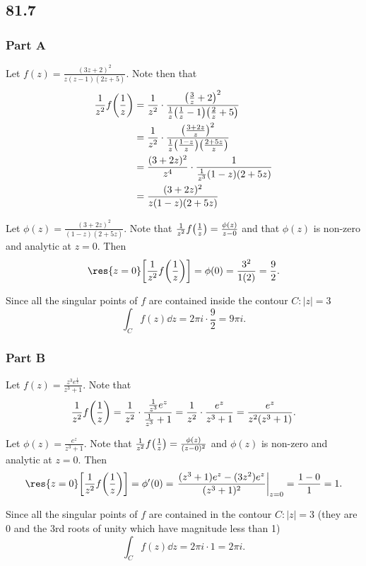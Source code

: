 \documentclass[12pt]{extarticle}
\begin{document}
\subsection*{81.7}
\begin{problem} \subsubsection*{Part A}
    Let $f(z) = \frac{(3z+2)^2}{z(z-1)(2 z+5)}$. Note then that
    \begin{align*}
        \frac{1}{z^2} f\qty(\frac{1}{z}) &= \frac{1}{z^2} \cdot \frac{\qty(\frac{3}{z} + 2)^2}{\frac{1}{z}\qty(\frac{1}{z} - 1)\qty(\frac{2}{z}+5)} \\
        &= \frac{1}{z^2}\cdot\frac{\qty(\frac{3+2z}{z})^2}{\frac{1}{z}\qty(\frac{1-z}{z})\qty(\frac{2+5z}{z})} \\
        &= \frac{(3+2z)^2}{z^4} \cdot \frac{1}{\frac{1}{z^3} (1-z)(2+5z)} \\
        &= \frac{(3+2z)^2}{z(1-z)(2+5z)}
    \end{align*}

    Let $\phi(z) = \frac{(3+2z)^2}{(1-z)(2+5z)}$. Note that $\frac{1}{z^2} f\qty(\frac{1}{z}) = \frac{\phi(z)}{z - 0}$ and that $\phi(z)$ is non-zero and analytic at $z=0$. Then
    \[
        \res{z=0}\qty[\frac{1}{z^2} f\qty(\frac{1}{z})] = \phi(0) = \frac{3^2}{1(2)} = \frac{9}{2}
    .\]

    Since all the singular points of $f$ are contained inside the contour $C : |z| = 3$
    \[
        \int_C f(z) \dd z = 2 \pi i \cdot \frac{9}{2} = 9 \pi i
    .\]
\end{problem}

\begin{problem} \subsubsection*{Part B}
    Let $f(z) = \frac{z^3 e^{\frac{1}{z}}}{z^3 + 1}$. Note that
    \[
        \frac{1}{z^2} f\qty(\frac{1}{z}) = \frac{1}{z^2}\cdot \frac{\frac{1}{z^3} e^z}{\frac{1}{z^3} + 1} = \frac{1}{z^2} \cdot \frac{e^z}{z^3 + 1} = \frac{e^z}{z^2 (z^3 + 1)}
    .\]

    Let $\phi(z) = \frac{e^z}{z^3+1}$. Note that $\frac{1}{z^2} f\qty(\frac{1}{z}) = \frac{\phi(z)}{(z-0)^2}$ and $\phi(z)$ is non-zero and analytic at $z = 0$. Then
    \[
        \res{z=0} \qty[\frac{1}{z^2} f\qty(\frac{1}{z})] = \phi'(0) = 
        \eval{\frac{(z^3+1)e^z - (3z^2)e^z}{(z^3+1)^2}}_{z=0} =
        \frac{1 - 0}{1} = 1
    .\]

    Since all the singular points of $f$ are contained in the contour $C : |z| = 3$ (they are $0$ and the $3$rd roots of unity which have magnitude less than 1)
    \[
        \int_C f(z) \dd z = 2 \pi i \cdot 1 = 2 \pi i
    .\]
\end{problem}
\end{document}
